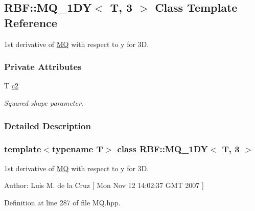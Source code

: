 \hypertarget{classRBF_1_1MQ__1DY_3_01T_00_013_01_4}{
\subsection{RBF::MQ\_\-1DY$<$ T, 3 $>$ Class Template Reference}
\label{classRBF_1_1MQ__1DY_3_01T_00_013_01_4}
}
1st derivative of \hyperlink{classRBF_1_1MQ}{MQ} with respect to y for 3D.  


\subsubsection*{Private Attributes}
\begin{CompactItemize}
\item 
\hypertarget{classRBF_1_1MQ__1DY_3_01T_00_013_01_4_adf95257ca3ff2c29f8c82d8d3ffedef}{
T \hyperlink{classRBF_1_1MQ__1DY_3_01T_00_013_01_4_adf95257ca3ff2c29f8c82d8d3ffedef}{c2}}
\label{classRBF_1_1MQ__1DY_3_01T_00_013_01_4_adf95257ca3ff2c29f8c82d8d3ffedef}

\begin{CompactList}\small\item\em Squared shape parameter. \item\end{CompactList}\end{CompactItemize}


\subsubsection{Detailed Description}
\subsubsection*{template$<$typename T$>$ class RBF::MQ\_\-1DY$<$ T, 3 $>$}

1st derivative of \hyperlink{classRBF_1_1MQ}{MQ} with respect to y for 3D. 

\begin{Desc}
\item[Author:]Luis M. de la Cruz \mbox{[} Mon Nov 12 14:02:37 GMT 2007 \mbox{]} \end{Desc}


Definition at line 287 of file MQ.hpp.
